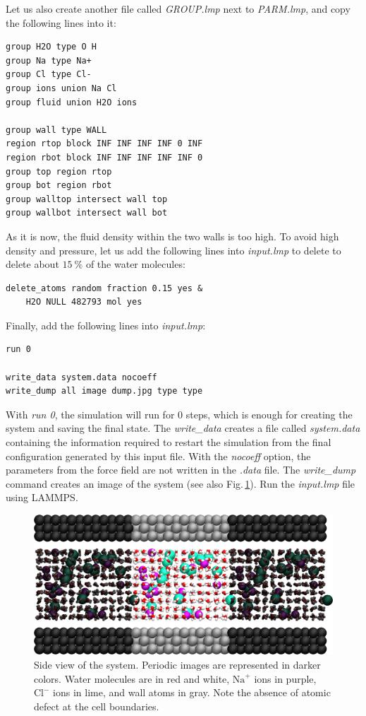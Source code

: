 \documentclass[9pt,tutorial]{livecoms}
\begin{document}
Let us also create another file called \textit{GROUP.lmp} next to
\textit{PARM.lmp}, and copy the following lines into it:
\begin{lstlisting}
group H2O type O H
group Na type Na+
group Cl type Cl-
group ions union Na Cl
group fluid union H2O ions

group wall type WALL
region rtop block INF INF INF INF 0 INF
region rbot block INF INF INF INF INF 0
group top region rtop
group bot region rbot
group walltop intersect wall top
group wallbot intersect wall bot
\end{lstlisting}
As it is now, the fluid density within the two walls is too high. To avoid
high density and pressure, let us add the following lines into \textit{input.lmp}
to delete to delete about $15~\%$ of the water molecules:
\begin{lstlisting}
delete_atoms random fraction 0.15 yes &
    H2O NULL 482793 mol yes
\end{lstlisting}
Finally, add the following lines into \textit{input.lmp}:
\begin{lstlisting}
run 0

write_data system.data nocoeff
write_dump all image dump.jpg type type
\end{lstlisting}
With \textit{run 0}, the simulation will run for 0 steps, which is enough for
creating the system and saving the final state. The \textit{write\_data}
creates a file called \textit{system.data} containing the information required
to restart the simulation from the final configuration generated by this input
file. With the \textit{nocoeff} option, the parameters from the force field are
not written in the \textit{.data} file. The \textit{write\_dump} command creates
an image of the system (see also Fig.\,\ref{fig:NANOSHEAR-system}).
Run the \textit{input.lmp} file using LAMMPS.

\begin{figure}
\centering
\includegraphics[width=\linewidth]{NANOSHEAR-system}
\caption{Side view of the system. Periodic images are represented in darker colors.
Water molecules are in red and white, $\text{Na}^+$ ions in purple, $\text{Cl}^-$
ions in lime, and wall atoms in gray. Note the absence of atomic defect at the
cell boundaries.}
\label{fig:NANOSHEAR-system}
\end{figure}
\end{document}
